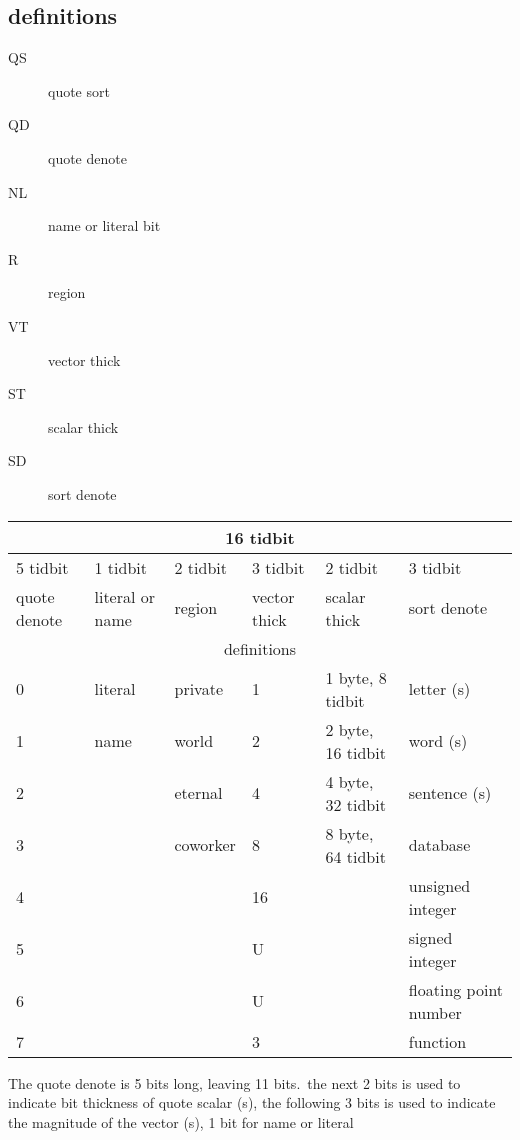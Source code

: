 \subsection{definitions}
\begin{description}
  \item [QS] quote sort 
  \item [QD] quote denote
  \item [NL] name or literal bit
  \item [R] region
  \item [VT] vector thick
  \item [ST] scalar thick
  \item [SD] sort denote
\end{description}

\begin{tabular}{*{6}{l}}
\toprule
\multicolumn{6}{|c|}{16 tidbit}\\
\midrule
5 tidbit     & 1 tidbit & 2 tidbit            & 3 tidbit        & 2 tidbit & 3 tidbit \\
\midrule
quote denote & literal or name & region & vector thick & scalar thick & sort denote \\
\midrule
\midrule
\multicolumn{6}{|c|}{definitions}\\
\bottomrule
0            & literal& private  & 1  & 1 byte, 8 tidbit      & letter (s) \\
1            & name   & world    & 2 & 2 byte, 16 tidbit     & word (s) \\
2            &        & eternal  & 4 & 4 byte, 32 tidbit     & sentence (s) \\
3            &        & coworker & 8     & 8 byte, 64 tidbit     & database \\
4            &         & & 16                                  & & unsigned integer \\
5            &         & & U                                   & & signed integer \\
6            &         & & U                                   & & floating point number \\
7            &         & & 3                                   & & function \\
\bottomrule
\end{tabular}
The quote denote is 5 bits long, leaving 11 bits.\
the next 2 bits is used to indicate bit thickness of quote scalar (s),
the following 3 bits is used to indicate the magnitude of the vector (s),
1 bit for name or literal

